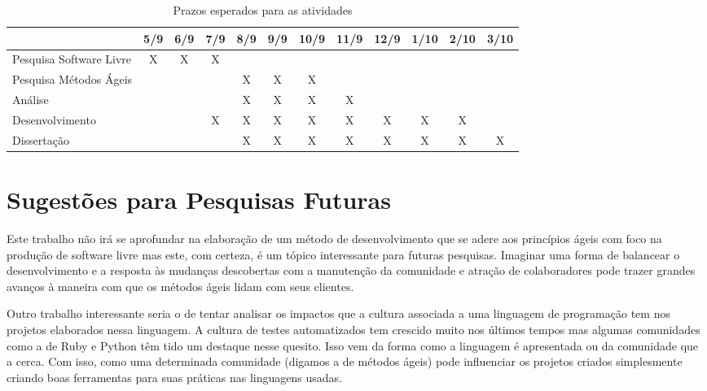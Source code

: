 \begin{table}
  \centering
  \begin{tabular}{|l|c|c|c|c|c|c|c|c|c|c|c|}
    \hline
    & 5/9 & 6/9 & 7/9 & 8/9 & 9/9 & 10/9 & 11/9 & 12/9 &
    1/10 & 2/10 & 3/10\\
    \hline
    Pesquisa Software Livre & X & X & X & & & & & & & &\\
    \hline
    Pesquisa Métodos Ágeis & & & & X & X & X & & & & &\\
    \hline
    Análise  & & & & X & X & X & X & & & &\\
    \hline
    Desenvolvimento & & & X & X & X & X & X & X & X & X & \\
    \hline
    Dissertação & & & & X & X & X & X & X & X & X & X \\
    \hline
  \end{tabular}
  \caption{Prazos esperados para as atividades}
  \label{tab:crono}
\end{table}

\section{Sugestões para Pesquisas Futuras}
\label{sec:sugestoes}

Este trabalho não irá se aprofundar na elaboração de um método de
desenvolvimento que se adere aos princípios ágeis com foco na produção
de software livre mas este, com certeza, é um tópico interessante para
futuras pesquisas. Imaginar uma forma de balancear o desenvolvimento e
a resposta às mudanças descobertas com a manutenção da comunidade e
atração de colaboradores pode trazer grandes avanços à maneira com que
os métodos ágeis lidam com seus clientes.

Outro trabalho interessante seria o de tentar analisar os impactos que
a cultura associada a uma linguagem de programação tem nos projetos
elaborados nessa linguagem. A cultura de testes automatizados tem
crescido muito nos últimos tempos mas algumas comunidades como a de
Ruby e Python têm tido um destaque nesse quesito. Isso vem da forma
como a linguagem é apresentada ou da comunidade que a cerca. Com isso,
como uma determinada comunidade (digamos a de métodos ágeis) pode
influenciar os projetos criados simplesmente criando boas ferramentas
para suas práticas nas linguagens usadas.
